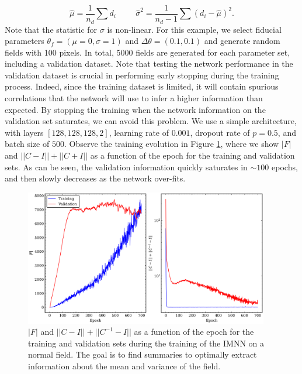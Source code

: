 \begin{equation}
    \hat{\mu}=\frac{1}{n_d}\sum d_i \hspace{1cm} \hat{\sigma}^2 = \frac{1}{n_d-1}\sum (d_i -\hat{\mu})^2.
\end{equation}
Note that the statistic for $\sigma$ is non-linear.
For this example, we select fiducial parameters $\theta_f=(\mu=0, \sigma=1)$ and $\Delta \theta=(0.1 , 0.1)$ and generate random fields with 100 pixels. In total, 5000 fields are generated for each parameter set, including a validation dataset. Note that testing the network performance in the validation dataset is crucial in performing early stopping during the training process. Indeed, since the training dataset is limited, it will contain spurious correlations that the network will use to infer a higher information than expected. By stopping the training when the network information on the validation set saturates, we can avoid this problem. We use a simple architecture, with layers $[128,128,128,2]$, learning rate of $0.001$, dropout rate of $p=0.5$, and batch size of $500$. Observe the training evolution in Figure \ref{fig:IMNN training normal test}, where we show $|F|$ and $||C-I ||+||C+I||$ as a function of the epoch for the training and validation sets. As can be seen, the validation information quickly saturates in $\sim 100$ epochs, and then slowly decreases as the network over-fits.

\begin{figure}[h!]
    \centering
    \includegraphics[width=0.95\textwidth]{img/ML/normal_plot_training.png}
    \caption{$|F|$ and $||C-I||+||C^{-1}-I||$ as a function of the epoch for the training and validation sets during the training of the IMNN on a normal field. The goal is to find summaries to optimally extract information about the mean and variance of the field.}
    \label{fig:IMNN training normal test}
\end{figure}

